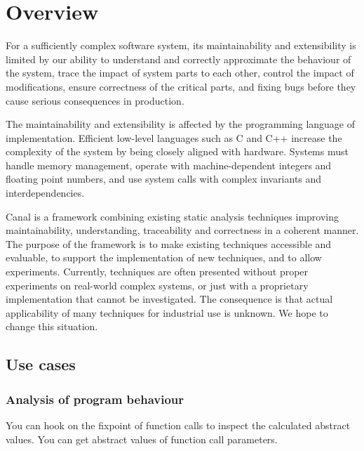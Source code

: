 \documentclass[a4paper]{book}
\title{Canal\\
\vskip 1em
\large{a static code analysis tool}}
\author{Karel Klíč}
\begin{document}
\maketitle

\tableofcontents

\cleardoublepage

\chapter{Overview}

For a sufficiently complex software system, its maintainability and
extensibility is limited by our ability to understand and correctly
approximate the behaviour of the system, trace the impact of system
parts to each other, control the impact of modifications, ensure
correctness of the critical parts, and fixing bugs before they cause
serious consequences in production.

The maintainability and extensibility is affected by the programming
language of implementation.  Efficient low-level languages such as C
and C++ increase the complexity of the system by being closely aligned
with hardware. Systems must handle memory management, operate with
machine-dependent integers and floating point numbers, and use system
calls with complex invariants and interdependencies.

Canal is a framework combining existing static analysis techniques
improving maintainability, understanding, traceability and correctness
in a coherent manner.  The purpose of the framework is to make
existing techniques accessible and evaluable, to support the
implementation of new techniques, and to allow experiments.
Currently, techniques are often presented without proper experiments
on real-world complex systems, or just with a proprietary
implementation that cannot be investigated.  The consequence is that
actual applicability of many techniques for industrial use is unknown.
We hope to change this situation.

\section{Use cases}
\subsection{Analysis of program behaviour}
You can hook on the fixpoint of function calls to inspect the
calculated abstract values.  You can get abstract values of function
call parameters.
\end{document}
